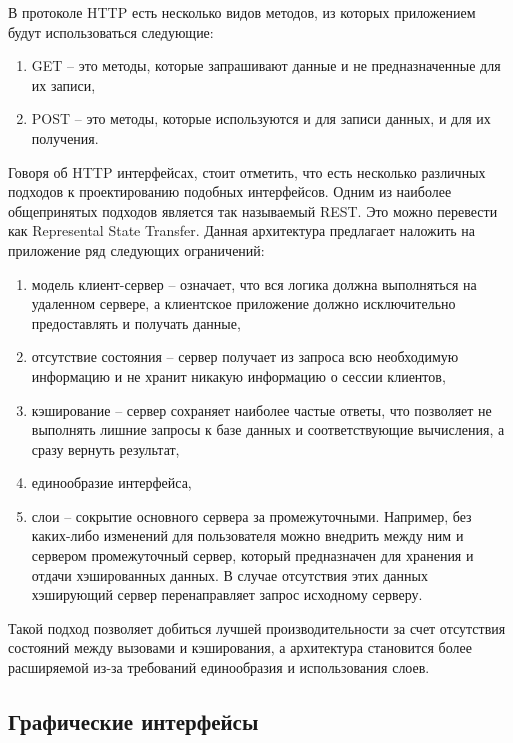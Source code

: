 В протоколе HTTP есть несколько видов методов, из которых приложением будут использоваться следующие:

\begin{enumerate}
    \item GET -- это методы, которые запрашивают данные и не предназначенные для их записи,
    \item POST -- это методы, которые используются и для записи данных, и для их получения.
\end{enumerate}

Говоря об HTTP интерфейсах, стоит отметить, что есть несколько различных подходов к проектированию
подобных интерфейсов. Одним из наиболее общепринятых подходов является так называемый REST.
Это можно перевести как Represental State Transfer\cite{REST}. Данная архитектура предлагает
наложить на приложение ряд следующих ограничений:

\begin{enumerate}
    \item модель клиент-сервер -- означает, что вся логика должна выполняться на удаленном сервере,
    а клиентское приложение должно исключительно предоставлять и получать данные,
    \item отсутствие состояния -- сервер получает из запроса всю необходимую информацию и не хранит
    никакую информацию о сессии клиентов,
    \item кэширование -- сервер сохраняет наиболее частые ответы, что позволяет не выполнять
    лишние запросы к базе данных и соответствующие вычисления, а сразу вернуть результат,
    \item единообразие интерфейса,
    \item слои -- сокрытие основного сервера за промежуточными. Например, без каких-либо
    изменений для пользователя можно внедрить между ним и сервером промежуточный сервер, который
    предназначен для хранения и отдачи хэшированных данных. В случае отсутствия этих данных
    хэширующий сервер перенаправляет запрос исходному серверу.
\end{enumerate}

Такой подход позволяет добиться лучшей производительности за счет отсутствия состояний между
вызовами и кэширования, а архитектура становится более расширяемой из-за требований
единообразия и использования слоев.

\subsection*{Графические интерфейсы}

